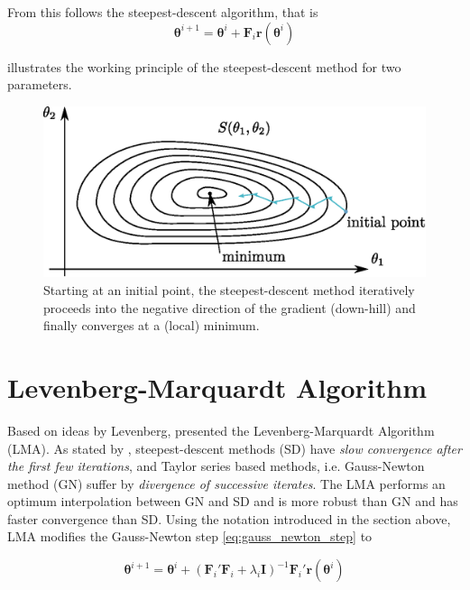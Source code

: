 From this follows the steepest-descent algorithm, that is
\begin{equation}
\boldsymbol{\theta}^{i+1} =
\boldsymbol{\theta}^{i} +
\mathbf{F}_i \mathbf{r}(\boldsymbol{\theta}^{i})
\end{equation}

 illustrates the working principle of the steepest-descent method for two parameters.

\begin{figure}[hbtp]
\centering
\includegraphics[width = 0.6 \textwidth]{images/steepest_descent.eps}
\caption{Starting at an initial point, the steepest-descent method iteratively proceeds into the negative direction of the gradient (down-hill) and finally converges at a (local) minimum.}
\label{fig:steepest_descent}
\end{figure}



\section{Levenberg-Marquardt Algorithm}
Based on ideas by Levenberg, \citet{Marquardt1963} presented the Levenberg-Marquardt Algorithm (LMA).
As stated by \citeauthor{Marquardt1963},
steepest-descent methods (SD) have \textit{slow convergence after the first few iterations},
and Taylor series based methods, i.e. Gauss-Newton method (GN) suffer by \textit{divergence of successive iterates}.
The LMA performs an optimum interpolation between GN and SD
and is more robust than GN and has faster convergence than SD.
Using the notation introduced in the section above, LMA modifies the Gauss-Newton step \cref{eq:gauss_newton_step} to

\begin{equation}
\label{eq:lma_step}
\boldsymbol{\theta}^{i+1} =
\boldsymbol{\theta}^{i} + 
(\mathbf{F}_i' \mathbf{F}_i + \lambda_i \mathbf{I})^{-1} \mathbf{F}_i' \mathbf{r}(\boldsymbol{\theta}^{i})
\end{equation}

